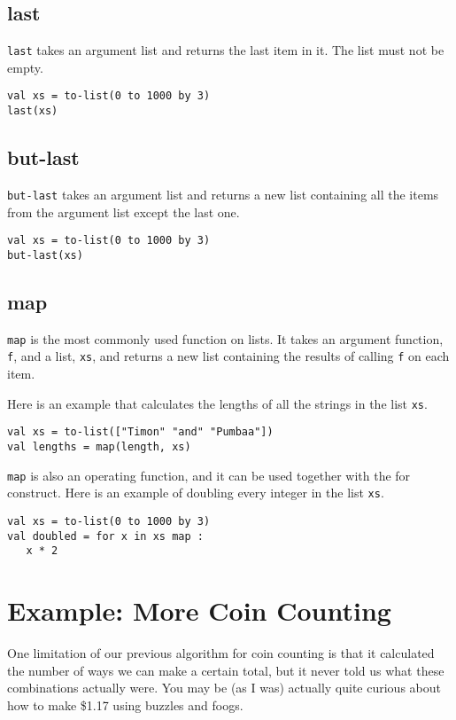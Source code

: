 \documentclass[10pt,oneside]{book}
\begin{document}
\subsection*{last}
\texttt{\frenchspacing last} takes an argument list and returns the last item in it. The list must not be empty.
\begin{lstlisting}
val xs = to-list(0 to 1000 by 3)
last(xs)
\end{lstlisting}

\subsection*{but-last}
\texttt{\frenchspacing but-last} takes an argument list and returns a new list containing all the items from the argument list except the last one.
\begin{lstlisting}
val xs = to-list(0 to 1000 by 3)
but-last(xs)
\end{lstlisting}

\subsection*{map}
\texttt{\frenchspacing map} is the most commonly used function on lists. It takes an argument function, \texttt{\frenchspacing f}, and a list, \texttt{\frenchspacing xs}, and returns a new list containing the results of calling \texttt{\frenchspacing f} on each item.

Here is an example that calculates the lengths of all the strings in the list \texttt{\frenchspacing xs}.
\begin{lstlisting}
val xs = to-list(["Timon" "and" "Pumbaa"])
val lengths = map(length, xs)
\end{lstlisting}

\texttt{\frenchspacing map} is also an operating function, and it can be used together with the for construct. Here is an example of doubling every integer in the list \texttt{\frenchspacing xs}.
\begin{lstlisting}
val xs = to-list(0 to 1000 by 3)
val doubled = for x in xs map :
   x * 2
\end{lstlisting}

\section{Example: More Coin Counting}
One limitation of our previous algorithm for coin counting is that it calculated the number of ways we can make a certain total, but it never told us what these combinations actually were. You may be (as I was) actually quite curious about how to make \$1.17 using buzzles and foogs.
\end{document}
